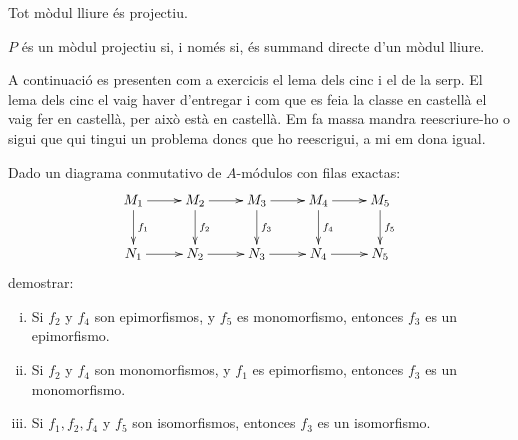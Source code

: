 \documentclass[../../../main.tex]{subfiles}
\begin{document}
\begin{prop}
\label{prop:lliureImplicaProjectiu} Tot mòdul lliure és projectiu.
\end{prop}

\begin{prop}
\label{prop:projectiuSiiSumandDirecteModulLliure} $P$ és un mòdul projectiu si, i només si, és summand directe d'un mòdul lliure.
\end{prop}

A continuació es presenten com a exercicis el lema dels cinc i el de la serp. El lema dels cinc el vaig haver d'entregar i com que es feia la classe en castellà el vaig fer en castellà, per això està en castellà. Em fa massa mandra reescriure-ho o sigui que qui tingui un problema doncs que ho reescrigui, a mi em dona igual.

\setcounter{exercici}{35}
\begin{exercici}
\label{exercici:lemaCinc} Dado un diagrama conmutativo de $A$-módulos con filas exactas:
\begin{equation}
    \notag
    \xymatrix{
    M_1 \ar[d]^{f_1}\ar[r] & M_2\ar[r]\ar[d]^{f_2} & M_3 \ar[r]\ar[d]^{f_3} & M_4\ar[r]\ar[d]^{f_4} & M_5\ar[d]^{f_5}\\
    N_1\ar[r] & N_2\ar[r] & N_3\ar[r] & N_4\ar[r] & N_5
    }
\end{equation}
demostrar:
\begin{enumerate}[(i)]
    \item Si $f_2$ y $f_4$ son epimorfismos, y $f_5$ es monomorfismo, entonces $f_3$ es un epimorfismo.
    \item Si $f_2$ y $f_4$ son monomorfismos, y $f_1$ es epimorfismo, entonces $f_3$ es un monomorfismo.
    \item Si $f_1,f_2,f_4$ y $f_5$ son isomorfismos, entonces $f_3$ es un isomorfismo.
\end{enumerate}
\end{exercici}
\end{document}
